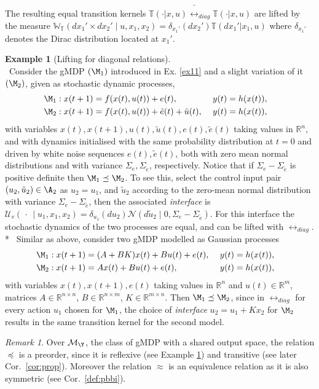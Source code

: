 \documentclass[letterpaper, 10 pt, conference]{amsart}
\theoremstyle{definition}
\theoremstyle{example}
\newtheorem{example}{Example}
\theoremstyle{remark}
\newtheorem{remark}{Remark}
\newcommand{\InF}{\mathcal{U}_{v}}
\newcommand{\Wt}{\mathbb{W}_{\mathbb{T}}}
\begin{document}
The resulting equal
 transition kernels  $\mathbb{T}(\cdot|x,{u})\bar\rel_{diag}\mathbb{T}(\cdot|x,{u})$
  are lifted by the measure $\Wt(dx_1'\times dx_2'{\mid} u, x_1,x_2)=\delta_{x_1'}(dx_2')\mathbb{T}(dx_1'|x_1,u)$  where $\delta_{x_1'}$ denotes the Dirac distribution located at $x_1'$.  
\begin{example}[Lifting for diagonal relations]\label{ex:1} \mbox{ }\\ 
~Consider the gMDP $(\M_1)$ introduced in Ex. \ref{ex11} and a slight variation of it $(\M_2)$, given as stochastic dynamic processes, 
\begin{align*}\textstyle&\M_1:  
x(t+1)=f(x(t),u(t))+ e(t),&\ y(t)&=h(x(t)),&\\ \textstyle&\M_2:   
x(t+1)=f(x(t),u(t))+ \tilde e(t)+\tilde u(t), &\ 
y(t)&=h(x(t)), &
\end{align*}
with variables $ x(t),x(t+1), u(t), \tilde u(t) , e(t),\tilde e(t)$ taking values in $\mathbb R^n$, 
and with dynamics initialised with the same probability distribution at $t=0$ and driven by white noise sequences $e(t),\tilde e(t)$, 
both with zero mean normal distributions and with variance $\Sigma_e, \Sigma_{\tilde e}$, respectively.  Notice that if $\Sigma_e-\Sigma_{\tilde e}$ is positive definite then $\M_1\preceq \M_2$.  To see this, 
select the control input pair $(u_2,\tilde u_2) \in \A_2$ as $u_2=u_1$, 
and $\tilde u_2$ according to the zero-mean normal distribution with variance $\Sigma_e-\Sigma_{\tilde e}$, 
then the associated \emph{interface }is $\InF(\,\cdot\,{\mid}u_1,x_1,x_2)=\delta_{u_1}(du_2)\mathcal N(d\tilde u_2{\mid} 0,\Sigma_e-\Sigma_{\tilde e})$.  
For this interface the stochastic dynamics of the two processes are equal, 
and can be lifted with $\rel_{diag}$.\\*\noindent{$\bf b.$}~
Similar as above, consider 
two gMDP modelled as Gaussian processes 
\begin{align*}&\M_1:  
x(t+1)=(A+BK)x(t)+ Bu(t)+ e(t),&\ y(t)&=h(x(t)),&\\ &\M_2:   
x(t+1)=Ax(t)+B u(t)+ e(t), &\ 
y(t)&=h(x(t)), &
\end{align*} 
with variables $ x(t),x(t+1), e(t)$ taking values in $\mathbb R^n$ and $u(t)\in \mathbb R^m$, matrices $A\in \mathbb R^{n\times n}$, $B\in \mathbb{R}^{n\times m}$, $K\in\mathbb R^{m\times n}$.  Then  $\M_1\preceq\M_2$, since in $\rel_{diag}$
for every action $u_1$ chosen for $\M_1$, the choice of \emph{interface}  $u_2=u_1+Kx_2$ for $\M_2$ results in the same transition kernel for the second model.   
 

\end{example}
\begin{remark} 
Over $\mathcal M_\Y$, 
the class of gMDP with a shared output space, 
the relation $\preceq$ is a preorder, 
since it is reflexive (see Example \ref{ex:1}) and transitive (see later Cor.~\ref{cor:prop}). 
Moreover the relation $\approx$ is an equivalence relation as it is also symmetric (see Cor.~\ref{def:pbbi}). 
\end{remark} 
\end{document}
